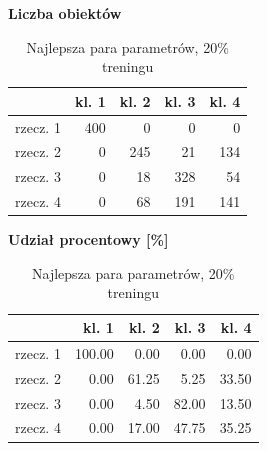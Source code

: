 \documentclass[11pt,a4paper]{article}
\begin{document}
\begin{table}[H]
\centering
\small
\caption{Najlepsza para parametrów, 20\% treningu}
\begin{minipage}{0.47\textwidth}
\centering
\textbf{Liczba obiektów}\\[0.35em]
\begin{tabular}{lrrrr}
\toprule
 & kl. 1 & kl. 2 & kl. 3 & kl. 4 \\
\midrule
rzecz. 1 & 400 & 0 & 0 & 0 \\
rzecz. 2 & 0 & 245 & 21 & 134 \\
rzecz. 3 & 0 & 18 & 328 & 54 \\
rzecz. 4 & 0 & 68 & 191 & 141 \\
\bottomrule
\end{tabular}
\end{minipage}\hfill
\begin{minipage}{0.47\textwidth}
\centering
\textbf{Udział procentowy [\%]}\\[0.35em]
\begin{tabular}{lrrrr}
\toprule
 & kl. 1 & kl. 2 & kl. 3 & kl. 4 \\
\midrule
rzecz. 1 & 100.00 & 0.00 & 0.00 & 0.00 \\
rzecz. 2 & 0.00 & 61.25 & 5.25 & 33.50 \\
rzecz. 3 & 0.00 & 4.50 & 82.00 & 13.50 \\
rzecz. 4 & 0.00 & 17.00 & 47.75 & 35.25 \\
\bottomrule
\end{tabular}
\end{minipage}
\end{table}
\end{document}
